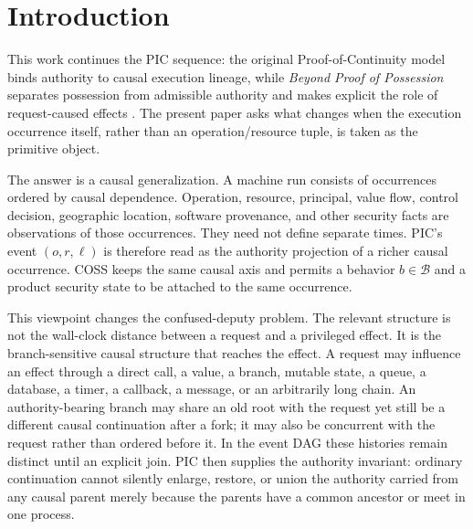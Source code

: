 \documentclass[10pt,twocolumn]{article}
\begin{document}
\begin{abstract}
We then revisit Rajani, Garg, and Rezk (RGR).  Their capability semantics blocks
explicit designation but not all value, control-flow, or initial-heap attacks;
their full provenance semantics tracks explicit and implicit influence and
proves CDA-freedom with endorsement for their whole region calculus.  From the
causal PIC view, these attack classes are different witnesses of causal
ancestry.  Full provenance is therefore a concrete evidence mechanism for
recovering data/control edges of the common causal graph, not the foundation of
the PIC impossibility theorem.  The paper finally lifts the construction to the
COSS product of heterogeneous security-state coordinates.  ``Total'' here is
model-relative and ordinary-segment-relative: it covers all represented PIC
lineage-form CDA instances whose request/effect pair satisfies the ordinary
continuation premise, not physical channels or non-conservative transitions
outside that scope.
\end{abstract}

\section{Introduction}

This work continues the PIC sequence: the original Proof-of-Continuity model
binds authority to causal execution lineage, while \emph{Beyond Proof of
Possession} separates possession from admissible authority and makes explicit
the role of request-caused effects \cite{gallo_poc2026,gallo_relational2026}.
The present paper asks what changes when the execution occurrence itself,
rather than an operation/resource tuple, is taken as the primitive object.

The answer is a causal generalization.  A machine run consists of occurrences
ordered by causal dependence.  Operation, resource, principal, value flow,
control decision, geographic location, software provenance, and other security
facts are observations of those occurrences.  They need not define separate
times.  PIC's event $(o,r,\ell)$ is therefore read as the authority projection
of a richer causal occurrence.  COSS keeps the same causal axis and permits a
behavior $b\in\mathcal B$ and a product security state to be attached to the
same occurrence.

This viewpoint changes the confused-deputy problem.  The relevant structure is
not the wall-clock distance between a request and a privileged effect.  It is
the branch-sensitive causal structure that reaches the effect.  A request may
influence an effect through a direct call, a value, a branch, mutable state, a
queue, a database, a timer, a callback, a message, or an arbitrarily long
chain.  An authority-bearing branch may share an old root with the request yet
still be a different causal continuation after a fork; it may also be
concurrent with the request rather than ordered before it.  In the event DAG
these histories remain distinct until an explicit join.  PIC then supplies the
authority invariant: ordinary continuation cannot silently enlarge, restore,
or union the authority carried from any causal parent merely because the
parents have a common ancestor or meet in one process.
\end{document}

